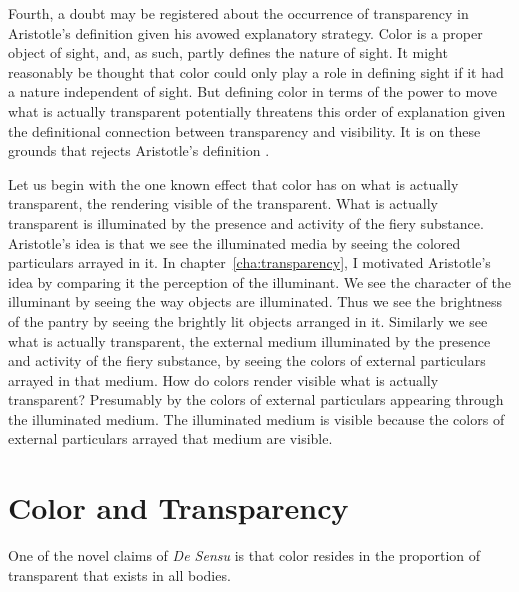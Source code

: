 
Fourth, a doubt may be registered about the occurrence of transparency in Aristotle's definition given his avowed explanatory strategy. Color is a proper object of sight, and, as such, partly defines the nature of sight. It might reasonably be thought that color could only play a role in defining sight if it had a nature independent of sight. But defining color in terms of the power to move what is actually transparent potentially threatens this order of explanation given the definitional connection between transparency and visibility. It is on these grounds that \citet{Zabarella:1605kx} rejects Aristotle's definition \citep[see][for discussion]{Broackes:1999uq}.

Let us begin with the one known effect that color has on what is actually transparent, the rendering visible of the transparent. What is actually transparent is illuminated by the presence and activity of the fiery substance. Aristotle's idea is that we see the illuminated media by seeing the colored particulars arrayed in it. In chapter~\ref{cha:transparency}, I motivated Aristotle's idea by comparing it the perception of the illuminant. We see the character of the illuminant by seeing the way objects are illuminated. Thus we see the brightness of the pantry by seeing the brightly lit objects arranged in it. Similarly we see what is actually transparent, the external medium illuminated by the presence and activity of the fiery substance, by seeing the colors of external particulars arrayed in that medium. How do colors render visible what is actually transparent? Presumably by the colors of external particulars appearing through the illuminated medium. The illuminated medium is visible because the colors of external particulars arrayed that medium are visible.


\section{Color and Transparency} %
\label{sec:color_and_transparency}

One of the novel claims of \emph{De Sensu} is that color resides in the proportion of transparent that exists in all bodies.


